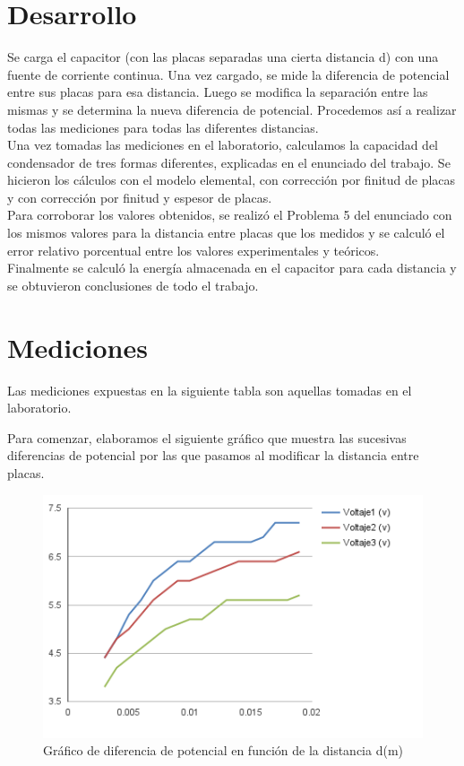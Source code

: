 \documentclass{article}
\begin{document}
\section{Desarrollo}

Se carga el capacitor (con las placas separadas una cierta distancia d) con 
una fuente de corriente continua. Una vez cargado, se mide la 
diferencia de potencial entre sus placas para esa distancia. Luego se modifica la separación 
entre las mismas y se determina la nueva diferencia de potencial. Procedemos así a realizar todas las mediciones para todas las diferentes distancias.\\
Una vez tomadas las mediciones en el laboratorio, calculamos la capacidad del condensador de tres formas diferentes, explicadas en el enunciado del trabajo. Se hicieron los cálculos con el modelo elemental, con corrección por finitud de placas y con corrección por finitud y espesor de placas.\\
Para corroborar los valores obtenidos, se realizó el Problema 5 del enunciado con los mismos valores para la distancia entre placas que los medidos y se calculó el error relativo porcentual entre los valores experimentales y teóricos.\\
Finalmente se calculó la energía almacenada en el capacitor para cada distancia y se obtuvieron conclusiones de todo el trabajo.


\section{Mediciones}
Las mediciones expuestas en la siguiente tabla son aquellas tomadas en el laboratorio.

    \begin{table}[H]
	\centering
	
    \end{table}
    
Para comenzar, elaboramos el siguiente gráfico que muestra las sucesivas diferencias de potencial por las que pasamos al modificar la distancia entre placas.

    \begin{figure}[H]
    \centering
    \includegraphics[scale=0.75]{voltajes.png}
    \caption{Gráfico de diferencia de potencial en función de la distancia d(m)}
    \label{fig: 2}
    \end{figure}
    
\end{document}
